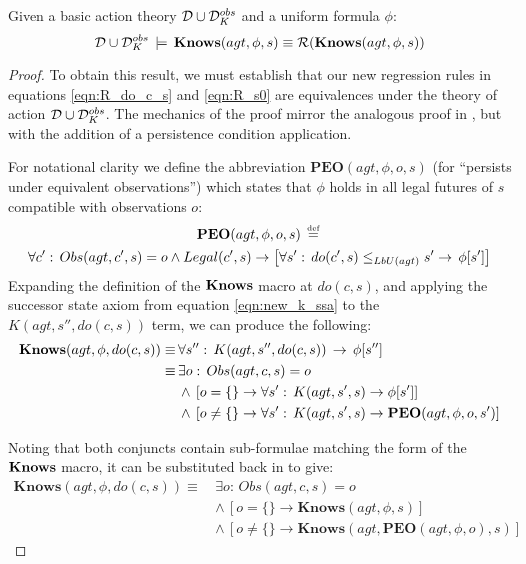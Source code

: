 \begin{thmext}
[\ref{thm:Reg_Knows}] Given a basic action theory $\mathcal{D}\cup\mathcal{D}_{K}^{obs}$
and a uniform formula $\phi$:\[
\mathcal{D}\cup\mathcal{D}_{K}^{obs}\,\models\,\mathbf{Knows}(agt,\phi,s)\equiv\mathcal{R}(\mathbf{Knows}(agt,\phi,s))\]

\end{thmext}
\begin{proof}
To obtain this result, we must establish that our new regression rules
in equations \eqref{eqn:R_do_c_s} and \eqref{eqn:R_s0} are equivalences
under the theory of action $\mathcal{D}\cup\mathcal{D}_{K}^{obs}$. The mechanics
of the proof mirror the analogous proof in \citep{scherl03sc_knowledge},
but with the addition of a persistence condition application.

For notational clarity we define the abbreviation $\mathbf{PEO}(agt,\phi,o,s)$
(for {}``persists under equivalent observations'') which states
that $\phi$ holds in all legal futures of $s$ compatible with observations
$o$:\begin{multline*}
\mathbf{PEO}(agt,\phi,o,s)\,\stackrel{\mbox{\tiny def}}{=}\,\\
\forall c':\, Obs(agt,c',s)=o\wedge Legal(c',s)\rightarrow\left[\forall s':\, do(c',s)\leq_{LbU(agt)}s'\rightarrow\,\phi[s']\right]\end{multline*}
 Expanding the definition of the $\mathbf{Knows}$ macro at $do(c,s)$, and
applying the successor state axiom from equation \eqref{eqn:new_k_ssa}
to the $K(agt,s'',do(c,s))$ term, we can produce the following:\begin{align*}
\mathbf{Knows}(agt,\phi,do(c,s))\equiv\, & \forall s'':\, K(agt,s'',do(c,s))\,\rightarrow\,\phi[s'']\\
\equiv\, & \exists o:\, Obs(agt,c,s)=o\\
 & \wedge\,\left[o=\{\}\rightarrow\forall s':\, K(agt,s',s)\rightarrow\phi[s']\right]\\
 & \wedge\,\left[o\neq\{\}\rightarrow\forall s':\, K(agt,s',s)\rightarrow\mathbf{PEO}(agt,\phi,o,s')\right]\end{align*}


Noting that both conjuncts contain sub-formulae matching the form
of the $\mathbf{Knows}$ macro, it can be substituted back in to give:\begin{align*}
\mathbf{Knows}(agt,\phi,do(c,s))\equiv\, & \exists o:\, Obs(agt,c,s)=o\\
 & \wedge\,\left[o=\{\}\rightarrow\mathbf{Knows}(agt,\phi,s)\right]\\
 & \wedge\,\left[o\neq\{\}\rightarrow\mathbf{Knows}(agt,\mathbf{PEO}(agt,\phi,o),s)\right]\end{align*}



\end{proof}
